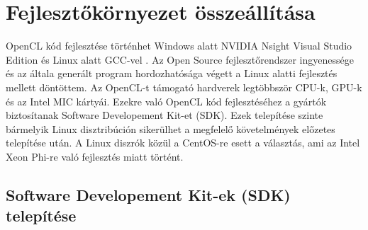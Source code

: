 \section{Fejlesztőkörnyezet összeállítása}

	OpenCL kód fejlesztése történhet Windows alatt NVIDIA Nsight Visual Studio
	Edition \cite{nsight} és Linux alatt GCC-vel \cite{gcc}.
	Az Open Source fejlesztőrendszer ingyenessége és az általa generált program hordozhatósága végett
	a Linux alatti fejlesztés mellett döntöttem. 
	Az OpenCL-t támogató hardverek legtöbbször CPU-k, GPU-k és az Intel MIC \cite{mic} kártyái.
	Ezekre való OpenCL kód fejlesztéséhez a gyártók biztosítanak Software Developement Kit-et (SDK).
	Ezek telepítése szinte bármelyik Linux disztribúción sikerülhet a megfelelő követelmények előzetes telepítése után.
	A Linux diszrók közül a CentOS-re \cite{centos} esett a választás, ami az Intel Xeon Phi-re való fejlesztés miatt történt.

\subsection*{Software Developement Kit-ek (SDK) telepítése} \label{sect:sdk}
